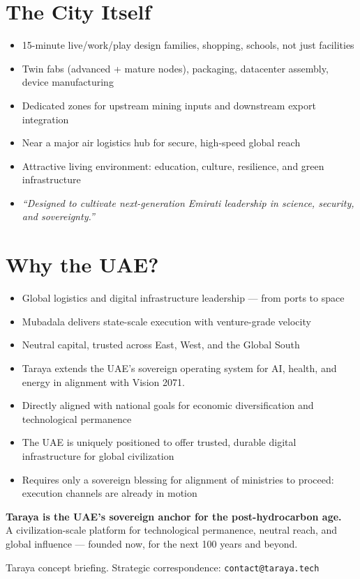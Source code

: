 \documentclass[12pt]{article}
\begin{document}
\begin{spacing}{1.08}
        \section*{The City Itself}
        \begin{itemize}
            \item 15-minute live/work/play design \textemdash{} families, shopping, schools, not just facilities
            \item Twin fabs (advanced + mature nodes), packaging, datacenter assembly, device manufacturing
            \item Dedicated zones for upstream mining inputs and downstream export integration
            \item Near a major air logistics hub for secure, high-speed global reach
            \item Attractive living environment: education, culture, resilience, and green infrastructure
            \item \textit{“Designed to cultivate next-generation Emirati leadership in science, security, and sovereignty.”}
        \end{itemize}

        \section*{Why the UAE?}
        \begin{itemize}
            \item Global logistics and digital infrastructure leadership — from ports to space
            \item Mubadala delivers state-scale execution with venture-grade velocity
            \item Neutral capital, trusted across East, West, and the Global South
            \item Taraya extends the UAE’s sovereign operating system for AI, health, and energy in alignment with Vision 2071.
            \item Directly aligned with national goals for economic diversification and technological permanence
            \item The UAE is uniquely positioned to offer trusted, durable digital infrastructure for global civilization
            \item Requires only a sovereign blessing for alignment of ministries to proceed: execution channels are already in motion
        \end{itemize}

        \noindent
        \textbf{Taraya is the UAE’s sovereign anchor for the post-hydrocarbon age.} \\
        A civilization-scale platform for technological permanence, neutral reach, and global influence — founded now, for the next 100 years and beyond.


        \vspace{1.5em}
        \begin{flushright}
            {\footnotesize Taraya concept briefing. Strategic correspondence: \texttt{contact@taraya.tech}}
        \end{flushright}
    \end{spacing}
\end{document}
